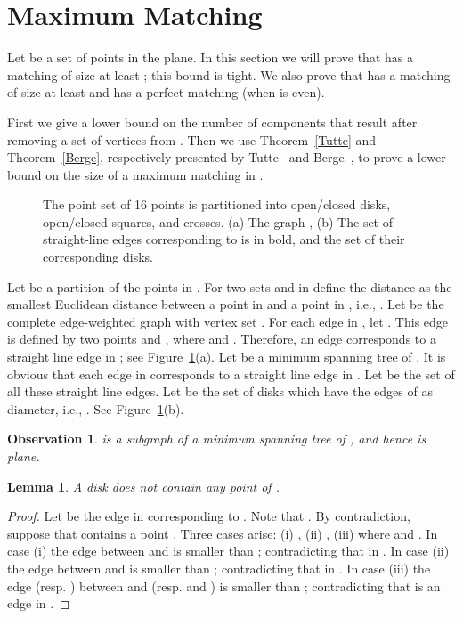 \documentclass[11pt,a4paper]{article}
\newcommand{\kGG}[2]{}
\newtheorem{lemma}{Lemma}
\newtheorem{observation}{Observation}
\begin{document}
\section{Maximum Matching}
\label{max-matching-section}
Let  be a set of  points in the plane. In this section we will prove that \kGG{0}{} has a matching of size at least ; this bound is tight. We also prove that \kGG{1}{} has a matching of size at least  and \kGG{2}{} has a perfect matching (when  is even).

First we give a lower bound on the number of components that result after removing a set  of vertices from \kGG{k}{}. Then we use Theorem~\ref{Tutte} and Theorem~\ref{Berge}, respectively presented by Tutte~\cite{Tutte1947} and Berge~\cite{Berge1958}, to prove a lower bound on the size of a maximum matching in \kGG{k}{}. 

\begin{figure}[htb]
  \centering
\setlength{\tabcolsep}{0in}
  
  \caption{The point set  of 16 points is partitioned into open/closed disks, open/closed squares, and crosses. (a) The graph , (b) The set  of straight-line edges corresponding to  is in bold, and the set  of their corresponding disks.}
\label{partition-fig}
\end{figure}

Let  be a partition of the points in . For two sets  and  in  define the distance  as the smallest Euclidean distance between a point in  and a point in , i.e., .
Let  be the complete edge-weighted graph with vertex set . For each edge  in , let . This edge  is defined by two points  and , where  and . Therefore, an edge  corresponds to a straight line edge  in ; see Figure~\ref{partition-fig}(a). Let  be a minimum spanning tree of . It is obvious that each edge  in  corresponds to a straight line edge  in . Let  be the set of all these straight line edges. Let  be the set of disks which have the edges of  as diameter, i.e., . See Figure~\ref{partition-fig}(b). 



\begin{observation}
 \label{T-plane}
 is a subgraph of a minimum spanning tree of , and hence  is plane.
\end{observation}

\begin{lemma}
 \label{D-empty}
A disk  does not contain any point of .
\end{lemma}
\begin{proof}
  Let  be the edge in  corresponding to . Note that . By contradiction, suppose that  contains a point . Three cases arise: (i) , (ii) , (iii)  where  and . In case (i) the edge  between  and  is smaller than ; contradicting that  in .  In case (ii) the edge  between  and  is smaller than ; contradicting that  in . In case (iii) the edge  (resp. ) between  and  (resp.  and ) is smaller than ; contradicting that  is an edge in . 
\end{proof}
\end{document}
